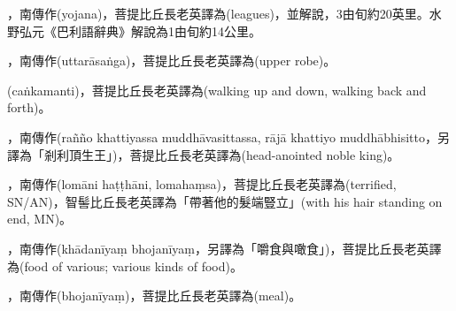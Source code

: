 \startitemgroup[noteitems]
\item{}，南傳作(yojana)，菩提比丘長老英譯為(leagues)，並解說，3由旬約20英里。水野弘元《巴利語辭典》解說為1由旬約14公里。
\stopitemgroup

\startitemgroup[noteitems]
\item{}，南傳作(uttarāsaṅga)，菩提比丘長老英譯為(upper robe)。
\stopitemgroup

\startitemgroup[noteitems]
\item{}(caṅkamanti)，菩提比丘長老英譯為(walking up and down, walking back and forth)。
\stopitemgroup

\startitemgroup[noteitems]
\item{}，南傳作(rañño khattiyassa muddhāvasittassa, rājā khattiyo muddhābhisitto，另譯為「剎利頂生王」)，菩提比丘長老英譯為(head-anointed noble king)。
\stopitemgroup

\startitemgroup[noteitems]
\item{}，南傳作(lomāni haṭṭhāni, lomahaṃsa)，菩提比丘長老英譯為(terrified, SN/AN)，智髻比丘長老英譯為「帶著他的髮端豎立」(with his hair standing on end, MN)。
\stopitemgroup

\startitemgroup[noteitems]
\item{}，南傳作(khādanīyaṃ bhojanīyaṃ，另譯為「嚼食與噉食」)，菩提比丘長老英譯為(food of various; various kinds of food)。
\item{}，南傳作(bhojanīyaṃ)，菩提比丘長老英譯為(meal)。
\stopitemgroup

